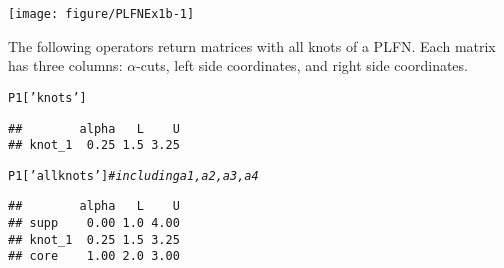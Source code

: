 \documentclass[11pt]{article}\usepackage[]{graphicx}\usepackage[]{color}
\makeatletter
\newcommand{\hlstr}[1]{\textcolor[rgb]{0.192,0.494,0.8}{#1}}%
\newcommand{\hlcom}[1]{\textcolor[rgb]{0.678,0.584,0.686}{\textit{#1}}}%
\newcommand{\hlstd}[1]{\textcolor[rgb]{0.345,0.345,0.345}{#1}}%
\newenvironment{kframe}{%
 \def\at@end@of@kframe{}%
 \ifinner\ifhmode%
  \def\at@end@of@kframe{\end{minipage}}%
  \begin{minipage}{\columnwidth}%
 \fi\fi%
 \def\FrameCommand##1{\hskip\@totalleftmargin \hskip-\fboxsep
 \colorbox{shadecolor}{##1}\hskip-\fboxsep
     \hskip-\linewidth \hskip-\@totalleftmargin \hskip\columnwidth}%
 \MakeFramed {\advance\hsize-\width
   \@totalleftmargin\z@ \linewidth\hsize
   \@setminipage}}%
 {\par\unskip\endMakeFramed%
 \at@end@of@kframe}
\newenvironment{knitrout}{}{} %
\makeatother
\begin{document}
\begin{center}
\begin{knitrout}\small
{}\color{fgcolor}

{\centering \texttt{[image: figure/PLFNEx1b-1]} 

}



\end{knitrout}
\end{center}

The following operators return matrices with all knots of a PLFN.
Each matrix has three columns: $\alpha$-cuts,
left side coordinates, and right side coordinates.

\begin{knitrout}\small
{}\color{fgcolor}\begin{kframe}
\begin{alltt}
\hlstd{P1[}\hlstr{'knots'}\hlstd{]}
\end{alltt}
\begin{verbatim}
##        alpha   L    U
## knot_1  0.25 1.5 3.25
\end{verbatim}
\begin{alltt}
\hlstd{P1[}\hlstr{'allknots'}\hlstd{]} \hlcom{# including a1,a2,a3,a4}
\end{alltt}
\begin{verbatim}
##        alpha   L    U
## supp    0.00 1.0 4.00
## knot_1  0.25 1.5 3.25
## core    1.00 2.0 3.00
\end{verbatim}
\end{kframe}
\end{knitrout}
\end{document}
